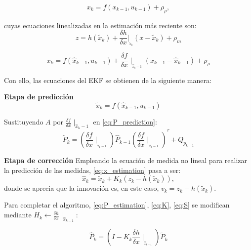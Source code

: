 \begin{equation}\label{eq:estado_nolineal}
    x_{k} = f(x_{k-1},u_{k-1})+\rho_{\rho},
\end{equation}

cuyas ecuaciones linealizadas en la estimación más reciente son:
\begin{equation}\label{eq:medida_linealizada}
    z = h(\tilde{x}_{k})+\frac{\delta h}{\delta x}|_{ _{\tilde{x}_k}} (x-\tilde{x}_{k})+\rho_{m}
\end{equation}

\begin{equation}\label{eq:estado_linealizada}
    x_{k} = f(\hat{x}_{k-1},u_{k-1})+\frac{\delta f}{\delta x}\mid _{_{\hat{x}_k-1}} (x_{k-1}-\hat{x}_{k-1})+\rho_{\rho}
\end{equation}

Con ello, las ecuaciones del EKF se obtienen de la siguiente manera:


\textbf{Etapa de predicción}
\begin{equation}\label{eq:x_predictionEKF}
    \tilde{x}_{k} = f(\hat{x}_{k-1},u_{k-1})
\end{equation}

Sustituyendo $A$ por $\frac{\delta f}{\delta x}\mid _{\hat{x}_k-1}$ en \ref{eq:P_prediction}:
\begin{equation}\label{eq:P_predictionEKF}
    \tilde{P}_{k} = (\frac{\delta f}{\delta x}\mid_{ _{\hat{x}_k-1}}) \hat{P}_{k-1} (\frac{\delta f}{\delta x}\mid_{ _{\hat{x}_k-1}})^{^{T}}+Q_{p_{k-1}}
\end{equation}


\textbf{Etapa de corrección}
Empleando la ecuación de medida no lineal para realizar la predicción de las medidas, \ref{eq:x_estimation} pasa a ser:
\begin{equation}\label{eq:x_estimationEKF}
    \hat{x}_{k} = \tilde{x}_{k}+K_{k}(z_{k}-h(\tilde{x}_{k})),
\end{equation}
donde se aprecia que la innovación es, en este caso, $v_{k} = z_{k}-h(\tilde{x}_{k})$.

Para completar el algoritmo,  \ref{eq:P_estimation}, \ref{eq:K}, \ref{eq:S} se modifican mediante $H_{k}\leftarrow \frac{\delta h}{\delta x}\mid_{\hat{x}_{k-1}}$:

\begin{equation}\label{eq:P_estimationEKF}
    \hat{P}_{k} = (I-K_{k}\frac{\delta h}{\delta x}\mid _{_{\hat{x}_{k-1}}})\tilde{P}_{k}
\end{equation}

